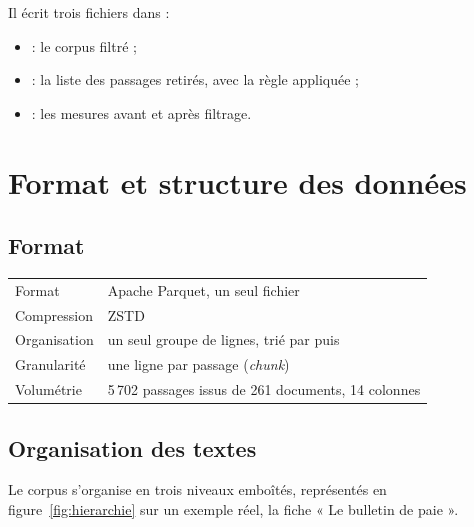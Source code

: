 Il écrit trois fichiers dans  :

\begin{itemize}
\item {} : le corpus filtré ;
\item {} : la liste des passages retirés, avec la règle appliquée ;
\item {} : les mesures avant et après filtrage.
\end{itemize}

\section{Format et structure des données}

\subsection{Format}

\begin{tabletype}
\begin{tabularx}{\textwidth}{@{}L{4cm}Y@{}}
\toprule
{} &  \\
\midrule
Format & Apache Parquet, un seul fichier \\
Compression & ZSTD \\
Organisation & un seul groupe de lignes, trié par  puis  \\
Granularité & une ligne par passage (\emph{chunk}) \\
Volumétrie & 5\,702 passages issus de 261 documents, 14 colonnes \\
\bottomrule
\end{tabularx}
\end{tabletype}

\subsection{Organisation des textes}

Le corpus s'organise en trois niveaux emboîtés, représentés en figure~\ref{fig:hierarchie} sur un
exemple réel, la fiche « Le bulletin de paie ».

